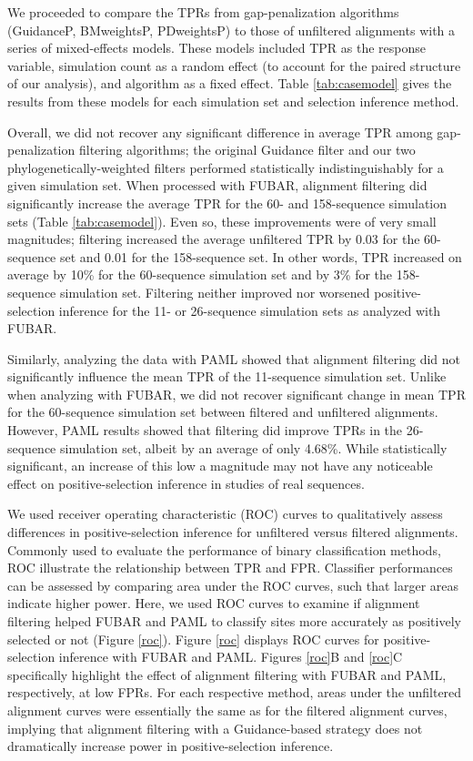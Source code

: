 \documentclass[11pt]{article}
\begin{document}
We proceeded to compare the TPRs from gap-penalization algorithms (GuidanceP, BMweightsP, PDweightsP) to those of unfiltered alignments with a series of mixed-effects models. These models included TPR as the response variable, simulation count as a random effect (to account for the paired structure of our analysis), and algorithm as a fixed effect. Table \ref{tab:casemodel} gives the results from these models for each simulation set and selection inference method.

Overall, we did not recover any significant difference in average TPR among gap-penalization filtering algorithms; the original Guidance filter and our two phylogenetically-weighted filters performed statistically indistinguishably for a given simulation set. When processed with FUBAR, alignment filtering did significantly increase the average TPR for the 60- and 158-sequence simulation sets (Table \ref{tab:casemodel}). Even so, these improvements were of very small magnitudes; filtering increased the average unfiltered TPR by 0.03 for the 60-sequence set and 0.01 for the 158-sequence set. In other words, TPR increased on average by 10\% for the 60-sequence simulation set and by 3\% for the 158-sequence simulation set. Filtering neither improved nor worsened positive-selection inference for the 11- or 26-sequence simulation sets as analyzed with FUBAR.

Similarly, analyzing the data with PAML showed that alignment filtering did not significantly influence the mean TPR of the 11-sequence simulation set. Unlike when analyzing with FUBAR, we did not recover significant change in mean TPR for the 60-sequence simulation set between filtered and unfiltered alignments. However, PAML results showed that filtering did improve TPRs in the 26-sequence simulation set, albeit by an average of only 4.68\%. While statistically significant, an increase of this low a magnitude may not have any noticeable effect on positive-selection inference in studies of real sequences. 

We used receiver operating characteristic (ROC) curves to qualitatively assess differences in positive-selection inference for unfiltered versus filtered alignments. Commonly used to evaluate the performance of binary classification methods, ROC illustrate the relationship between TPR and FPR. Classifier performances can be assessed by comparing area under the ROC curves, such that larger areas indicate higher power. Here, we used ROC curves to examine if alignment filtering helped FUBAR and PAML to classify sites more accurately as positively selected or not (Figure \ref{roc}).  Figure \ref{roc} displays ROC curves for positive-selection inference with FUBAR and PAML. Figures \ref{roc}B and \ref{roc}C specifically highlight the effect of alignment filtering with FUBAR and PAML, respectively, at low FPRs. For each respective method, areas under the unfiltered alignment curves were essentially the same as for the filtered alignment curves, implying that alignment filtering with a Guidance-based strategy does not dramatically increase power in positive-selection inference.
\end{document}
